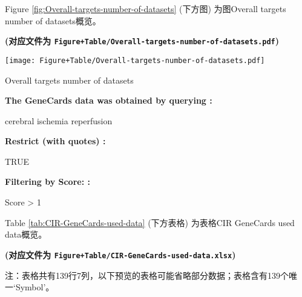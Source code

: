 \documentclass[
]{article}
\begin{document}
Figure \ref{fig:Overall-targets-number-of-datasets} (下方图) 为图Overall targets number of datasets概览。

\textbf{(对应文件为 \texttt{Figure+Table/Overall-targets-number-of-datasets.pdf})}

\def\@captype{figure}
\begin{center}
\texttt{[image: Figure+Table/Overall-targets-number-of-datasets.pdf]}
\caption{Overall targets number of datasets}\label{fig:Overall-targets-number-of-datasets}
\end{center}

\begin{center}\begin{tcolorbox}[colback=gray!10, colframe=gray!50, width=0.9\linewidth, arc=1mm, boxrule=0.5pt]
\textbf{
The GeneCards data was obtained by querying
:}

\vspace{0.5em}

    cerebral ischemia reperfusion

\vspace{2em}


\textbf{
Restrict (with quotes)
:}

\vspace{0.5em}

    TRUE

\vspace{2em}


\textbf{
Filtering by Score:
:}

\vspace{0.5em}

    Score > 1

\vspace{2em}
\end{tcolorbox}
\end{center}

Table \ref{tab:CIR-GeneCards-used-data} (下方表格) 为表格CIR GeneCards used data概览。

\textbf{(对应文件为 \texttt{Figure+Table/CIR-GeneCards-used-data.xlsx})}

\begin{center}\begin{tcolorbox}[colback=gray!10, colframe=gray!50, width=0.9\linewidth, arc=1mm, boxrule=0.5pt]注：表格共有139行7列，以下预览的表格可能省略部分数据；表格含有139个唯一`Symbol'。
\end{tcolorbox}
\end{center}
\end{document}
